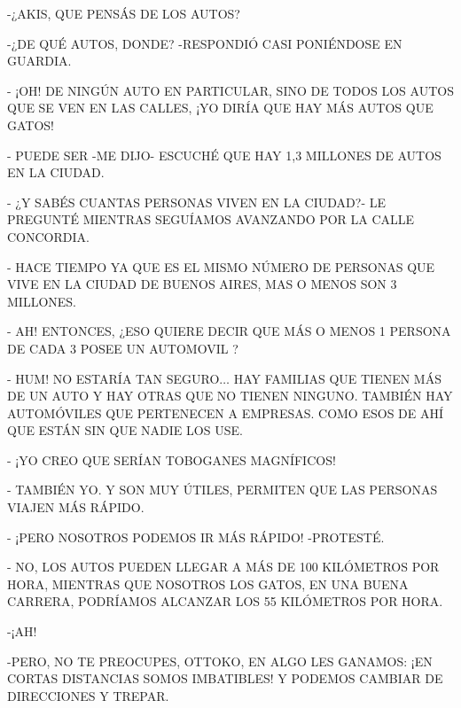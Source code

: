 -¿AKIS, QUE PENSÁS DE LOS AUTOS?

-¿DE QUÉ AUTOS, DONDE? -RESPONDIÓ CASI PONIÉNDOSE EN GUARDIA.

- ¡OH! DE NINGÚN AUTO EN PARTICULAR, SINO DE TODOS LOS AUTOS QUE SE VEN EN LAS CALLES, ¡YO DIRÍA QUE HAY MÁS AUTOS QUE GATOS!

- PUEDE SER -ME DIJO- ESCUCHÉ QUE HAY 1,3 MILLONES DE AUTOS EN LA CIUDAD.


\newpage
{}

- ¿Y SABÉS CUANTAS PERSONAS VIVEN EN LA CIUDAD?- LE PREGUNTÉ MIENTRAS SEGUÍAMOS AVANZANDO POR LA CALLE CONCORDIA.

- HACE TIEMPO YA QUE ES EL MISMO NÚMERO DE PERSONAS QUE VIVE EN LA CIUDAD DE BUENOS AIRES, MAS O MENOS SON 3 MILLONES.

- AH! ENTONCES, ¿ESO QUIERE DECIR QUE MÁS O MENOS 1 PERSONA DE CADA 3 POSEE UN AUTOMOVIL ? 

- HUM! NO ESTARÍA TAN SEGURO$\ldots$ HAY FAMILIAS QUE TIENEN MÁS DE UN AUTO Y HAY OTRAS QUE NO TIENEN NINGUNO. TAMBIÉN HAY AUTOMÓVILES QUE PERTENECEN A EMPRESAS. COMO ESOS DE AHÍ QUE ESTÁN SIN QUE NADIE LOS USE.

- ¡YO CREO QUE SERÍAN TOBOGANES MAGNÍFICOS!



\newpage
{}
- TAMBIÉN YO. Y SON MUY ÚTILES, PERMITEN QUE LAS PERSONAS VIAJEN MÁS RÁPIDO. 

- ¡PERO NOSOTROS PODEMOS IR MÁS RÁPIDO! -PROTESTÉ.

- NO, LOS AUTOS PUEDEN LLEGAR A MÁS DE 100 KILÓMETROS POR HORA, MIENTRAS QUE NOSOTROS LOS GATOS, EN UNA BUENA CARRERA, PODRÍAMOS ALCANZAR LOS 55 KILÓMETROS POR HORA.

-¡AH!

-PERO, NO TE PREOCUPES, OTTOKO, EN ALGO LES GANAMOS: ¡EN CORTAS DISTANCIAS SOMOS IMBATIBLES! Y PODEMOS CAMBIAR DE DIRECCIONES Y TREPAR.

